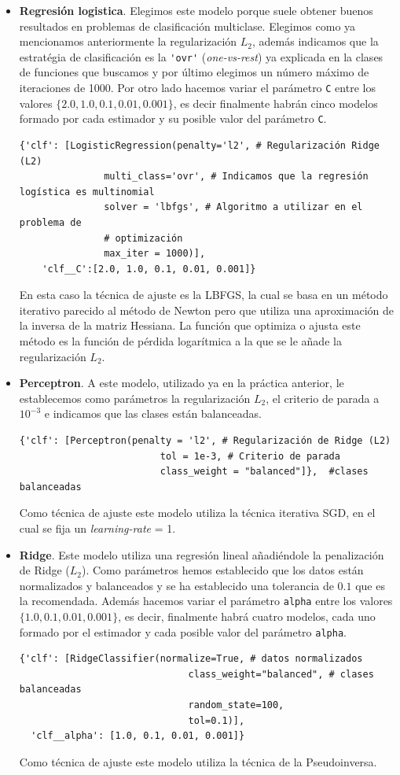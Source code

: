 \documentclass[size=a4, parskip=half, titlepage=false, toc=flat, toc=bib, 12pt]{scrartcl}
\begin{document}
\begin{itemize}
\item \textbf{Regresión logistica}. Elegimos este modelo porque suele obtener buenos resultados en problemas de clasificación multiclase. Elegimos como ya mencionamos anteriormente la regularización $L_2$, además indicamos que la estratégia de clasificación es la \verb|'ovr'| (\textit{one-vs-rest}) ya explicada en la clases de funciones que buscamos y por último elegimos un número máximo de iteraciones de 1000. Por otro lado hacemos variar el parámetro \verb|C| entre los valores $\{2.0, 1.0, 0.1 , 0.01, 0.001\}$, es decir finalmente habrán cinco modelos formado por cada estimador y su posible valor del parámetro \verb|C|.

\begin{verbatim}
{'clf': [LogisticRegression(penalty='l2', # Regularización Ridge (L2)
               multi_class='ovr', # Indicamos que la regresión logística es multinomial
               solver = 'lbfgs', # Algoritmo a utilizar en el problema de
               # optimización
               max_iter = 1000)],
    'clf__C':[2.0, 1.0, 0.1, 0.01, 0.001]}
\end{verbatim}
En esta caso la técnica de ajuste es la LBFGS, la cual se basa en un método iterativo parecido al método de Newton pero que utiliza una aproximación de la inversa de la matriz Hessiana. La función que optimiza o ajusta este método es la función de pérdida logarítmica a la que se le añade la regularización $L_2$.

\item \textbf{Perceptron}. A este modelo, utilizado ya en la práctica anterior, le establecemos como parámetros la regularización $L_2$, el criterio de parada a $10^{-3}$ e indicamos que las clases están balanceadas.
\begin{verbatim}
{'clf': [Perceptron(penalty = 'l2', # Regularización de Ridge (L2)
                         tol = 1e-3, # Criterio de parada
                         class_weight = "balanced"]},  #clases balanceadas
\end{verbatim}
Como técnica de ajuste este modelo utiliza la técnica iterativa SGD, en el cual se fija un \textit{learning-rate} = 1.
\item \textbf{Ridge}. Este modelo utiliza una regresión lineal añadiéndole la penalización de Ridge ($L_2$). Como parámetros hemos establecido que los datos están normalizados y balanceados y se ha establecido una tolerancia de $0.1$ que es la recomendada. Además hacemos variar el parámetro \verb|alpha| entre los valores $\{1.0, 0.1, 0.01, 0.001 \}$, es decir, finalmente habrá cuatro modelos, cada uno formado por el estimador y cada posible valor del parámetro \verb|alpha|.
\begin{verbatim}
{'clf': [RidgeClassifier(normalize=True, # datos normalizados
                              class_weight="balanced", # clases balanceadas
                              random_state=100,
                              tol=0.1)],
  'clf__alpha': [1.0, 0.1, 0.01, 0.001]}
\end{verbatim}
Como técnica de ajuste este modelo utiliza la técnica de la Pseudoinversa.
\end{itemize}
\end{document}
